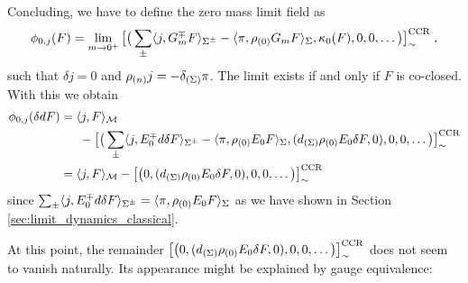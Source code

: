 Concluding, we have to define the zero mass limit field as
\begin{align}
	\phi_{0,j}(F) = \lim_{m \to 0^+} \big[\big( \sum_{\pm}\langle j , G_m^\mp F \rangle_{\Sigma^\pm} - \langle \pi , \rho_{(0)} G_m F \rangle_\Sigma, \kappa_0(F) , 0 , 0, \dots\big)\big]^\text{CCR}_\sim \;,
\end{align}
such that $\delta j=0$ and $\rho_{(n)} j= -\delta_{(\Sigma)} \pi$. The limit exists if and only if $F$ is co-closed. With this we obtain
\begin{align}
	\phi_{0,j} (\delta d F)
	&= \langle j ,  F \rangle_{\mathcal{M}} \notag \\
	&\phantom{=I}- \big[ \big(  \sum_{\pm}\langle j , E_0^\mp d\delta  F \rangle_{\Sigma^\pm} - \langle \pi , \rho_{(0)} E_0 F \rangle_\Sigma , (d_{(\Sigma)} \rho_{(0)} E_0  \delta F, 0) , 0 , 0, \dots\big)\big]^\text{CCR}_\sim \notag \\
	&= \langle j ,  F \rangle_{\mathcal{M}}
	- \big[ \big( 0 , (d_{(\Sigma)} \rho_{(0)} E_0  \delta F, 0) , 0 , 0, \dots\big)\big]^\text{CCR}_\sim
\end{align}
since $\sum_{\pm}\langle j , E_0^\mp d\delta  F \rangle_{\Sigma^\pm} = \langle \pi , \rho_{(0)} E_0 F \rangle_\Sigma$ as we have shown in Section \ref{sec:limit_dynamics_classical}.\par
At this point, the remainder $\big[ \big( 0 , (d_{(\Sigma)} \rho_{(0)} E_0  \delta F, 0) , 0 , 0, \dots\big)\big]^\text{CCR}_\sim $ does not seem to vanish naturally. Its appearance might be explained by gauge equivalence:
